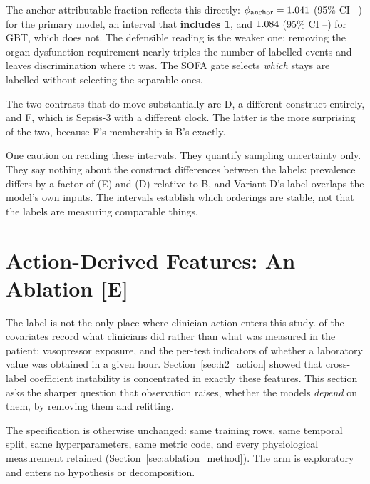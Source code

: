 The anchor-attributable fraction reflects this directly:
$\phi_{\text{anchor}} = 1.041$ (95\% CI
\pcPhiAnchorCiLoPrimary--\pcPhiAnchorCiHiPrimary) for the primary model, an
interval that \textbf{includes 1}, and $1.084$ (95\% CI
\pcPhiAnchorCiLoGbt--\pcPhiAnchorCiHiGbt) for GBT, which does not. The
defensible reading is the weaker one: removing the organ-dysfunction
requirement nearly triples the number of labelled events and leaves
discrimination where it was. The SOFA gate selects \emph{which} stays are
labelled without selecting the separable ones.

The two contrasts that do move substantially are D, a different construct
entirely, and F, which is Sepsis-3 with a different clock. The latter is the
more surprising of the two, because F's membership is B's exactly.

One caution on reading these intervals. They quantify sampling uncertainty
only. They say nothing about the construct differences between the labels:
prevalence differs by a factor of \pcAltEventRatioPrimaryE{} (E) and
\pcAltEventRatioPrimaryD{} (D) relative to B, and Variant D's label overlaps
the model's own inputs. The intervals establish which orderings are stable, not
that the labels are measuring comparable things.




\section{Action-Derived Features: An Ablation \texorpdfstring{[E]}{[E]}}
\label{sec:ablation}

The label is not the only place where clinician action enters this study.
\pcAblNDropped{} of the \pcHTwoNTerms{} covariates record what clinicians did
rather than what was measured in the patient: vasopressor exposure, and the
per-test indicators of whether a laboratory value was obtained in a given hour.
Section~\ref{sec:h2_action} showed that cross-label coefficient instability is
concentrated in exactly these features. This section asks the sharper question
that observation raises, whether the models \emph{depend} on them, by
removing them and refitting.

The specification is otherwise unchanged: same training rows, same temporal
split, same hyperparameters, same metric code, and every physiological
measurement retained (Section~\ref{sec:ablation_method}). The arm is
exploratory and enters no hypothesis or decomposition.

